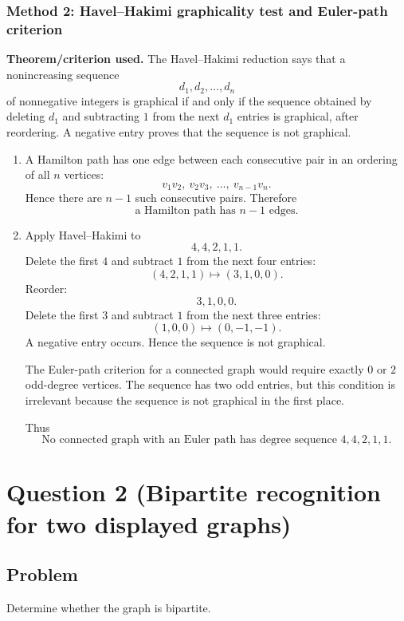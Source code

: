 \documentclass[12pt]{article}
\begin{document}
\subsubsection{Method 2: Havel--Hakimi graphicality test and Euler-path criterion}
\textbf{Theorem/criterion used.} The Havel--Hakimi reduction says that a nonincreasing sequence
\[
 d_1,d_2,\dots,d_n
\]
of nonnegative integers is graphical if and only if the sequence obtained by deleting $d_1$ and subtracting $1$ from the next $d_1$ entries is graphical, after reordering. A negative entry proves that the sequence is not graphical.

\begin{enumerate}[label=(\alph*)]
  \item A Hamilton path has one edge between each consecutive pair in an ordering of all $n$ vertices:
  \[
  v_1v_2,\ v_2v_3,\ \dots,\ v_{n-1}v_n.
  \]
  Hence there are $n-1$ such consecutive pairs. Therefore
  \[
  \boxed{\text{a Hamilton path has }n-1\text{ edges}.}
  \]

  \item Apply Havel--Hakimi to
  \[
  4,4,2,1,1.
  \]
  Delete the first $4$ and subtract $1$ from the next four entries:
  \[
  (4,2,1,1)\mapsto (3,1,0,0).
  \]
  Reorder:
  \[
  3,1,0,0.
  \]
  Delete the first $3$ and subtract $1$ from the next three entries:
  \[
  (1,0,0)\mapsto (0,-1,-1).
  \]
  A negative entry occurs. Hence the sequence is not graphical.

  The Euler-path criterion for a connected graph would require exactly $0$ or $2$ odd-degree vertices. The sequence has two odd entries, but this condition is irrelevant because the sequence is not graphical in the first place.

  Thus
  \[
  \boxed{\text{No connected graph with an Euler path has degree sequence }4,4,2,1,1.}
  \]
\end{enumerate}

\newpage
\section{Question 2 (Bipartite recognition for two displayed graphs)}

\subsection{Problem}
Determine whether the graph is bipartite.
\end{document}
